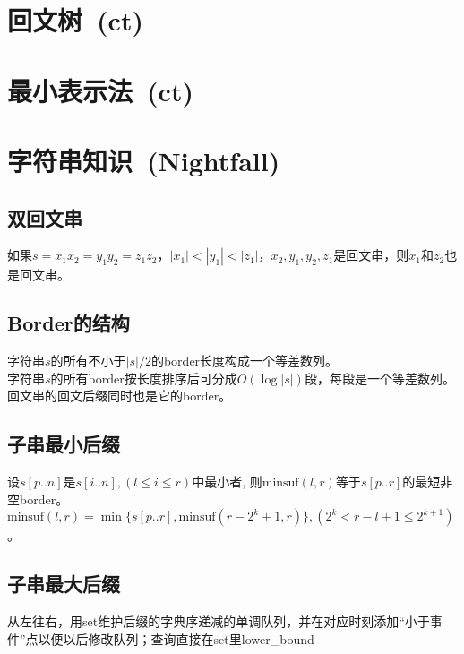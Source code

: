 \section{回文树\ \small(ct)}

\section{最小表示法\ \small(ct)}

\section{字符串知识\ \small(Nightfall)}
    \subsection*{双回文串}
        如果$ s = x_1 x_2 = y_1 y_2 = z_1 z_2 $，$ \left|x_1\right| < \left|y_1\right| < \left|z_1\right| $，$ x_2, y_1, y_2, z_1 $是回文串，则$ x_1 $和$ z_2 $也是回文串。
    \subsection*{Border的结构}
        字符串$ s $的所有不小于$ \left|s\right| / 2 $的border长度构成一个等差数列。
        \\字符串$ s $的所有border按长度排序后可分成$ O(\log \left| s \right|) $段，每段是一个等差数列。
        \\回文串的回文后缀同时也是它的border。
    \subsection*{子串最小后缀}
        设$ s[p..n] $是$ s[i..n], (l \leq i \leq r) $中最小者, 则$ \text{minsuf}(l, r) $等于$ s[p..r] $的最短非空border。$ \text{minsuf}(l, r) = \min \lbrace s[p..r], \text{minsuf}(r - 2^k + 1, r) \rbrace, (2^k < r - l + 1 \leq 2^{k + 1} ) $。
    \subsection*{子串最大后缀}
        从左往右，用set维护后缀的字典序递减的单调队列，并在对应时刻添加“小于事件”点以便以后修改队列；查询直接在set里lower\_bound
